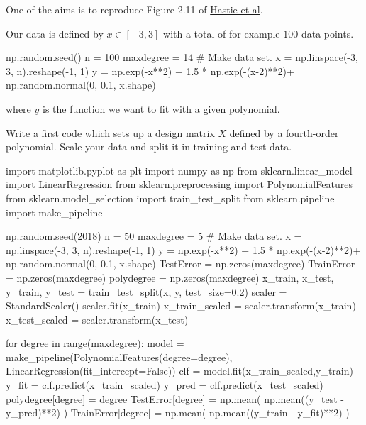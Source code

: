\documentclass[%
oneside,                 %
final,                   %
10pt]{article}
\begin{document}
One of 
the aims is to reproduce Figure 2.11 of \href{{https://github.com/CompPhysics/MLErasmus/blob/master/doc/Textbooks/elementsstat.pdf}}{Hastie et al}.

Our data is defined by $x\in [-3,3]$ with a total of for example $100$ data points.







\bpycod
np.random.seed()
n = 100
maxdegree = 14
# Make data set.
x = np.linspace(-3, 3, n).reshape(-1, 1)
y = np.exp(-x**2) + 1.5 * np.exp(-(x-2)**2)+ np.random.normal(0, 0.1, x.shape)

\epycod

where $y$ is the function we want to fit with a given polynomial.

Write a first code which sets up a design matrix $X$ defined by a fourth-order polynomial.  Scale your data and split it in training and test data. 





































\bpycod
import matplotlib.pyplot as plt
import numpy as np
from sklearn.linear_model import LinearRegression
from sklearn.preprocessing import PolynomialFeatures
from sklearn.model_selection import train_test_split
from sklearn.pipeline import make_pipeline


np.random.seed(2018)
n = 50
maxdegree = 5
# Make data set.
x = np.linspace(-3, 3, n).reshape(-1, 1)
y = np.exp(-x**2) + 1.5 * np.exp(-(x-2)**2)+ np.random.normal(0, 0.1, x.shape)
TestError = np.zeros(maxdegree)
TrainError = np.zeros(maxdegree)
polydegree = np.zeros(maxdegree)
x_train, x_test, y_train, y_test = train_test_split(x, y, test_size=0.2)
scaler = StandardScaler()
scaler.fit(x_train)
x_train_scaled = scaler.transform(x_train)
x_test_scaled = scaler.transform(x_test)

for degree in range(maxdegree):
    model = make_pipeline(PolynomialFeatures(degree=degree), LinearRegression(fit_intercept=False))
    clf = model.fit(x_train_scaled,y_train)
    y_fit = clf.predict(x_train_scaled)
    y_pred = clf.predict(x_test_scaled) 
    polydegree[degree] = degree
    TestError[degree] = np.mean( np.mean((y_test - y_pred)**2) )
    TrainError[degree] = np.mean( np.mean((y_train - y_fit)**2) )
\end{document}
